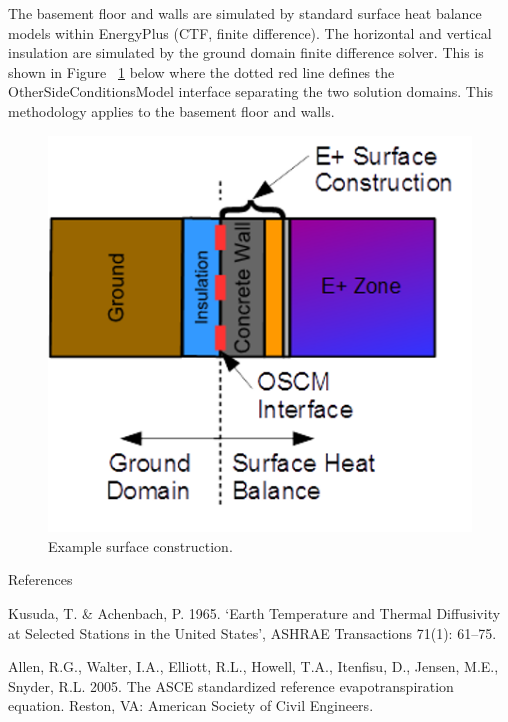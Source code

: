 The basement floor and walls are simulated by standard surface heat balance models within EnergyPlus (CTF, finite difference). The horizontal and vertical insulation are simulated by the ground domain finite difference solver. This is shown in Figure~
\ref{BasementGHTFigure1} below where the dotted red line defines the OtherSideConditionsModel interface separating the two solution domains. This methodology applies to the basement floor and walls.

\begin{figure}[htbp]
\centering
\includegraphics{media/image8000.png}
\caption{Example surface construction.}
\label{BasementGHTFigure1}
\end{figure}

References

Kusuda, T. \& Achenbach, P. 1965. `Earth Temperature and Thermal Diffusivity at Selected Stations in the United States', ASHRAE Transactions 71(1): 61--75.

Allen, R.G., Walter, I.A., Elliott, R.L., Howell, T.A., Itenfisu, D., Jensen, M.E., Snyder, R.L. 2005. The ASCE standardized reference evapotranspiration equation. Reston, VA: American Society of Civil Engineers.

